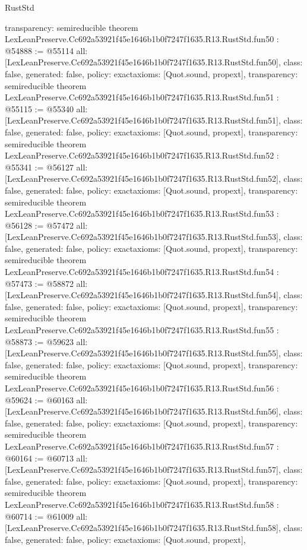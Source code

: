 \begin{lexlean}{RustStd}
\begin{coremodule}
{  transparency: semireducible
}
theorem LexLeanPreserve.Cc692a53921f45e1646b1b0f7247f1635.R13.RustStd.fun50 : @54888 := @55114 {
  all: [LexLeanPreserve.Cc692a53921f45e1646b1b0f7247f1635.R13.RustStd.fun50],
  class: false,
  generated: false,
  policy: exact{axioms: [Quot.sound, propext]},
  transparency: semireducible
}
theorem LexLeanPreserve.Cc692a53921f45e1646b1b0f7247f1635.R13.RustStd.fun51 : @55115 := @55340 {
  all: [LexLeanPreserve.Cc692a53921f45e1646b1b0f7247f1635.R13.RustStd.fun51],
  class: false,
  generated: false,
  policy: exact{axioms: [Quot.sound, propext]},
  transparency: semireducible
}
theorem LexLeanPreserve.Cc692a53921f45e1646b1b0f7247f1635.R13.RustStd.fun52 : @55341 := @56127 {
  all: [LexLeanPreserve.Cc692a53921f45e1646b1b0f7247f1635.R13.RustStd.fun52],
  class: false,
  generated: false,
  policy: exact{axioms: [Quot.sound, propext]},
  transparency: semireducible
}
theorem LexLeanPreserve.Cc692a53921f45e1646b1b0f7247f1635.R13.RustStd.fun53 : @56128 := @57472 {
  all: [LexLeanPreserve.Cc692a53921f45e1646b1b0f7247f1635.R13.RustStd.fun53],
  class: false,
  generated: false,
  policy: exact{axioms: [Quot.sound, propext]},
  transparency: semireducible
}
theorem LexLeanPreserve.Cc692a53921f45e1646b1b0f7247f1635.R13.RustStd.fun54 : @57473 := @58872 {
  all: [LexLeanPreserve.Cc692a53921f45e1646b1b0f7247f1635.R13.RustStd.fun54],
  class: false,
  generated: false,
  policy: exact{axioms: [Quot.sound, propext]},
  transparency: semireducible
}
theorem LexLeanPreserve.Cc692a53921f45e1646b1b0f7247f1635.R13.RustStd.fun55 : @58873 := @59623 {
  all: [LexLeanPreserve.Cc692a53921f45e1646b1b0f7247f1635.R13.RustStd.fun55],
  class: false,
  generated: false,
  policy: exact{axioms: [Quot.sound, propext]},
  transparency: semireducible
}
theorem LexLeanPreserve.Cc692a53921f45e1646b1b0f7247f1635.R13.RustStd.fun56 : @59624 := @60163 {
  all: [LexLeanPreserve.Cc692a53921f45e1646b1b0f7247f1635.R13.RustStd.fun56],
  class: false,
  generated: false,
  policy: exact{axioms: [Quot.sound, propext]},
  transparency: semireducible
}
theorem LexLeanPreserve.Cc692a53921f45e1646b1b0f7247f1635.R13.RustStd.fun57 : @60164 := @60713 {
  all: [LexLeanPreserve.Cc692a53921f45e1646b1b0f7247f1635.R13.RustStd.fun57],
  class: false,
  generated: false,
  policy: exact{axioms: [Quot.sound, propext]},
  transparency: semireducible
}
theorem LexLeanPreserve.Cc692a53921f45e1646b1b0f7247f1635.R13.RustStd.fun58 : @60714 := @61009 {
  all: [LexLeanPreserve.Cc692a53921f45e1646b1b0f7247f1635.R13.RustStd.fun58],
  class: false,
  generated: false,
  policy: exact{axioms: [Quot.sound, propext]},
}
\end{coremodule}
\end{lexlean}
